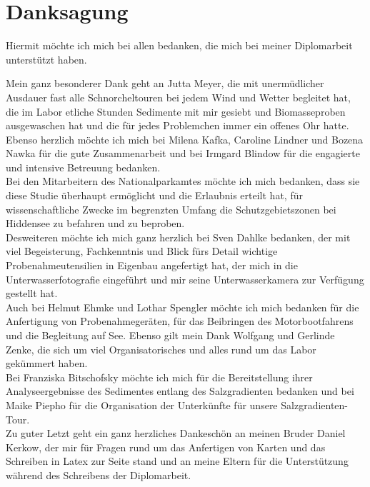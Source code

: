 \newpage

\section*{Danksagung}

Hiermit möchte ich mich bei allen bedanken, die mich bei meiner Diplomarbeit unterstützt haben.

Mein ganz besonderer Dank geht an Jutta Meyer, die mit unermüdlicher Ausdauer fast alle Schnorcheltouren bei jedem Wind und Wetter begleitet hat, die im Labor etliche Stunden Sedimente mit mir gesiebt und Biomasseproben ausgewaschen hat und die für jedes Problemchen immer ein offenes Ohr hatte. Ebenso herzlich möchte ich mich bei Milena Kafka, Caroline Lindner und Bozena Nawka für die gute Zusammenarbeit und bei Irmgard Blindow für die engagierte und intensive Betreuung bedanken. \\
Bei den Mitarbeitern des Nationalparkamtes möchte ich mich bedanken, dass sie diese Studie überhaupt ermöglicht und die Erlaubnis erteilt hat, für wissenschaftliche Zwecke im begrenzten Umfang die Schutzgebietszonen bei Hiddensee zu befahren und zu beproben.\\
Desweiteren möchte ich mich ganz herzlich bei Sven Dahlke bedanken, der mit viel Begeisterung, Fachkenntnis und Blick fürs Detail wichtige Probenahmeutensilien in Eigenbau angefertigt hat, der mich in die Unterwasserfotografie eingeführt und mir seine Unterwasserkamera zur Verfügung gestellt hat.\\ 
Auch bei Helmut Ehmke und Lothar Spengler möchte ich mich bedanken für die Anfertigung von Probenahmegeräten, für das Beibringen des Motorbootfahrens und die Begleitung auf See. Ebenso gilt mein Dank Wolfgang und Gerlinde Zenke, die sich um viel Organisatorisches und alles rund um das Labor gekümmert haben.\\
Bei Franziska Bitschofsky möchte ich mich für die Bereitstellung ihrer Analyseergebnisse des Sedimentes entlang des Salzgradienten bedanken und bei Maike Piepho für die Organisation der Unterkünfte für unsere Salzgradienten-Tour.\\
Zu guter Letzt geht ein ganz herzliches Dankeschön an meinen Bruder Daniel Kerkow, der mir für Fragen rund um das Anfertigen von Karten und das Schreiben in Latex zur Seite stand und an meine Eltern für die Unterstützung während des Schreibens der Diplomarbeit.\\


\newpage %

